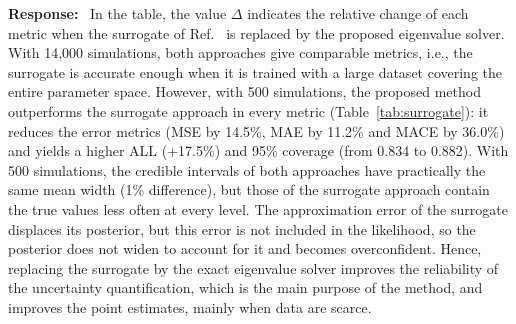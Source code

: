 \documentclass[11pt]{article}
\newenvironment{response}{\par\smallskip\noindent\color{resp}\textbf{Response:}\ }{\par}
\begin{document}
\begin{response}
In the table, the value $\Delta$ indicates the relative change of each metric when the surrogate of Ref.~\cite{Arxiv_Navamuel2026copula2d} is replaced by the proposed eigenvalue solver.
With 14,000 simulations, both approaches give comparable metrics, i.e., the surrogate is accurate enough when it is trained with a large dataset covering the entire parameter space. 
However, with 500 simulations, the proposed method outperforms the surrogate approach in every metric (Table~\ref{tab:surrogate}): it reduces the error metrics (MSE by 14.5\%, MAE by 11.2\% and MACE by 36.0\%) and yields a higher ALL (+17.5\%) and 95\% coverage (from 0.834 to 0.882).
With 500 simulations, the credible intervals of both approaches have practically the same mean width (1\% difference), but those of the surrogate approach contain the true values less often at every level. 
The approximation error of the surrogate displaces its posterior, but this error is not included in the likelihood, so the posterior does not widen to account for it and becomes overconfident. 
Hence, replacing the surrogate by the exact eigenvalue solver improves the reliability of the uncertainty quantification, which is the main purpose of the method, and improves the point estimates, mainly when data are scarce.






\end{response}
\end{document}
